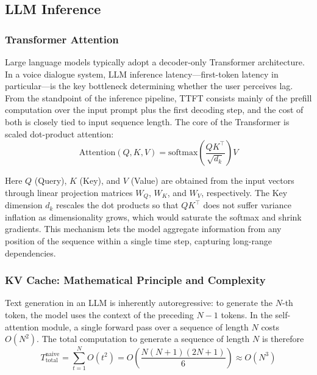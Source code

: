\documentclass[a4paper,11pt]{article}
\begin{document}
\subsection{LLM Inference}

\subsubsection{Transformer Attention}

Large language models typically adopt a decoder-only Transformer architecture. In a voice dialogue system, LLM inference latency---first-token latency in particular---is the key bottleneck determining whether the user perceives lag. From the standpoint of the inference pipeline, TTFT consists mainly of the prefill computation over the input prompt plus the first decoding step, and the cost of both is closely tied to input sequence length. The core of the Transformer is scaled dot-product attention:
\begin{equation}
\mathrm{Attention}(Q,K,V)=\mathrm{softmax}\!\left(\frac{QK^{\top}}{\sqrt{d_k}}\right)V
\label{eq:attention}
\end{equation}

Here $Q$ (Query), $K$ (Key), and $V$ (Value) are obtained from the input vectors through linear projection matrices $W_Q$, $W_K$, and $W_V$, respectively. The Key dimension $d_k$ rescales the dot products so that $QK^{\top}$ does not suffer variance inflation as dimensionality grows, which would saturate the softmax and shrink gradients. This mechanism lets the model aggregate information from any position of the sequence within a single time step, capturing long-range dependencies.

\subsubsection{KV Cache: Mathematical Principle and Complexity}

Text generation in an LLM is inherently autoregressive: to generate the $N$-th token, the model uses the context of the preceding $N-1$ tokens. In the self-attention module, a single forward pass over a sequence of length $N$ costs $O(N^{2})$. The total computation to generate a sequence of length $N$ is therefore
\begin{equation}
T_{\mathrm{total}}^{\mathrm{naive}}=\sum_{t=1}^{N}O(t^{2})=O\!\left(\frac{N(N+1)(2N+1)}{6}\right)\approx O(N^{3})
\label{eq:naive}
\end{equation}
\end{document}

